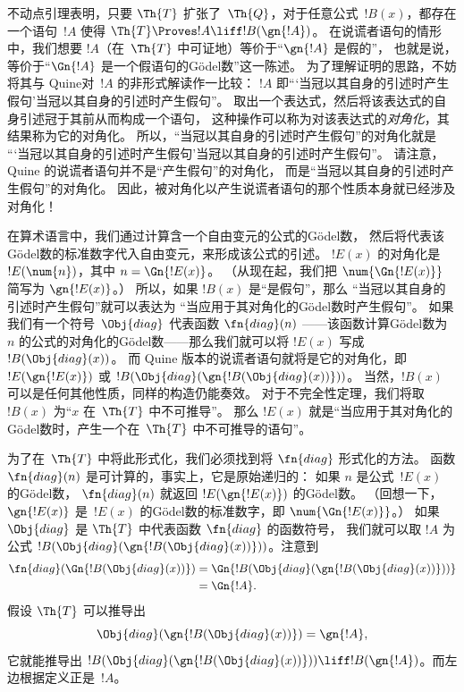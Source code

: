 \documentclass[../../../include/open-logic-section]{subfiles}
\begin{document}



\begin{explain}
不动点引理表明，只要 $\Th{T}$ 扩张了~$\Th{Q}$，对于任意公式~$!B(x)$，都存在一个语句~$!A$ 使得 $\Th{T} \Proves !A \liff !B(\gn{!A})$。
在说谎者语句的情形中，我们想要 $!A$（在~$\Th{T}$ 中可证地）等价于“$\gn{!A}$ 是假的”，
也就是说，等价于“$\Gn{!A}$ 是一个假语句的Gödel数”这一陈述。
为了理解证明的思路，不妨将其与 Quine对~$!A$ 的非形式解读作一比较：
$!A$ 即“‘当冠以其自身的引述时产生假句’当冠以其自身的引述时产生假句”。
取出一个表达式，然后将该表达式的自身引述冠于其前从而构成一个语句，
这种操作可以称为对该表达式的\emph{对角化}，其结果称为它的对角化。
所以，“当冠以其自身的引述时产生假句”的对角化就是
“‘当冠以其自身的引述时产生假句’当冠以其自身的引述时产生假句”。
请注意，Quine 的说谎者语句并不是“产生假句”的对角化，
而是“当冠以其自身的引述时产生假句”的对角化。
因此，被对角化以产生说谎者语句的那个性质本身就已经涉及对角化！

在算术语言中，我们通过计算含一个自由变元的公式的Gödel数，
然后将代表该Gödel数的标准数字代入自由变元，来形成该公式的引述。
$!E(x)$ 的对角化是 $!E(\num{n})$，其中 $n = \Gn{!E(x)}$。
（从现在起，我们把 $\num{\Gn{!E(x)}}$ 简写为 $\gn{!E(x)}$。）
所以，如果 $!B(x)$ 是“是假句”，那么
“当冠以其自身的引述时产生假句”就可以表达为
“当应用于其对角化的Gödel数时产生假句”。
如果我们有一个符号~$\Obj{diag}$ 代表函数 $\fn{diag}(n)$
——该函数计算Gödel数为~$n$ 的公式的对角化的Gödel数——那么我们就可以将 $!E(x)$ 写成
$!B(\Obj{diag}(x))$。
而 Quine 版本的说谎者语句就将是它的对角化，即 $!E(\gn{!E(x)})$ 或
$!B(\Obj{diag}(\gn{!B(\Obj{diag}(x))}))$。
当然，$!B(x)$ 可以是任何其他性质，同样的构造仍能奏效。
对于不完全性定理，我们将取 $!B(x)$ 为“$x$ 在~$\Th{T}$ 中不可推导”。
那么 $!E(x)$ 就是“当应用于其对角化的Gödel数时，产生一个在~$\Th{T}$ 中不可推导的语句”。

为了在~$\Th{T}$ 中将此形式化，我们必须找到将 $\fn{diag}$ 形式化的方法。
函数 $\fn{diag}(n)$ 是可计算的，事实上，它是原始递归的：
如果 $n$ 是公式~$!E(x)$ 的Gödel数，
$\fn{diag}(n)$ 就返回 $!E(\gn{!E(x)})$ 的Gödel数。
（回想一下，$\gn{!E(x)}$ 是~$!E(x)$ 的Gödel数的标准数字，即 $\num{\Gn{!E(x)}}$。）
如果 $\Obj{diag}$ 是 $\Th{T}$ 中代表函数 $\fn{diag}$ 的函数符号，
我们就可以取 $!A$ 为公式 $!B(\Obj{diag}(\gn{!B(\Obj{diag}(x))}))$。注意到
\begin{align*}
\fn{diag}(\Gn{!B(\Obj{diag}(x))}) & =
\Gn{!B(\Obj{diag}(\gn{!B(\Obj{diag}(x))}))} \\
& = \Gn{!A}.
\end{align*}
假设 $\Th{T}$ 可以推导出
\[
\Obj{diag}(\gn{!B(\Obj{diag}(x))}) = \gn{!A},
\]
它就能推导出 $!B(\Obj{diag}(\gn{!B(\Obj{diag}(x))}))
\liff !B(\gn{!A})$。而左边根据定义正是~$!A$。


\end{explain}
\end{document}
